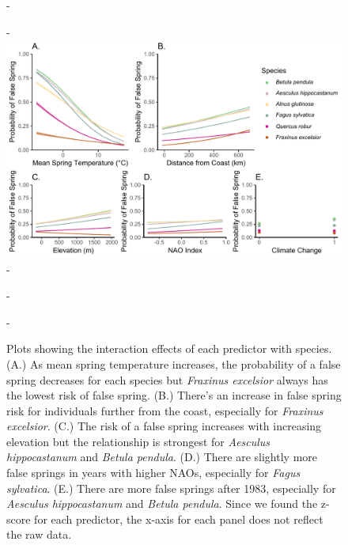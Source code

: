 \documentclass{article}\usepackage[]{graphicx}\usepackage[]{color}
\begin{document}
{\begin{figure} [H]
  -\begin{center}
  -\includegraphics[width=16cm]{..//figures/InteractionPlots/Species_orig.pdf}
  -\caption{Plots showing the interaction effects of each predictor with species. (A.) As mean spring temperature increases, the probability of a false spring decreases for each species but \textit{Fraxinus excelsior} always has the lowest risk of false spring. (B.) There's an increase in false spring risk for individuals further from the coast, especially for \textit{Fraxinus excelsior}. (C.) The risk of a false spring increases with increasing elevation but the relationship is strongest for \textit{Aesculus hippocastanum} and \textit{Betula pendula}. (D.) There are slightly more false springs in years with higher NAOs, especially for \textit{Fagus sylvatica}.  (E.) There are more false springs after 1983, especially for \textit{Aesculus hippocastanum} and \textit{Betula pendula}. Since we found the z-score for each predictor, the x-axis for each panel does not reflect the raw data.}\label{fig:spp}
  -\end{center}
  -\end{figure}}


  
\end{document}
